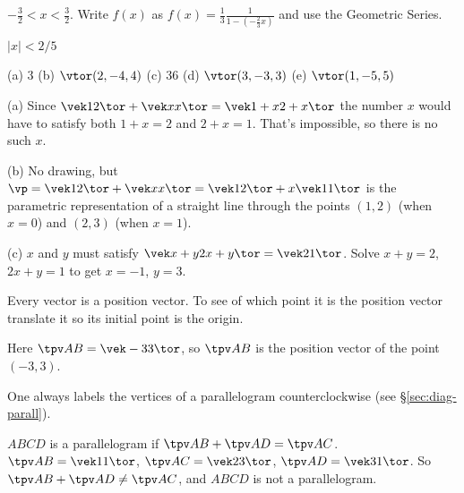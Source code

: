 \item[{\bfseries(V6.10)}]
$-\frac 32 < x < \frac 32$.  Write $f(x)$ as $f(x) = \frac 13 \frac
1{1-(-\frac23x)}$ and use the Geometric Series.
\bigskip

\item[{\bfseries(V6.11)}]
 $|x|<2/5$  %
\bigskip

\item[{\bfseries(VI9.3e)}]

(a) $3$ \quad
(b) $\vtor(2,-4,4)$  \quad
(c) 36  \quad
(d) $\vtor(3,-3,3)$  \quad
(e) $\vtor(1,-5,5)$
\bigskip

\item[{\bfseries(VI9.6c)}]

(a) Since $\vek 1 \\ 2 \tor +\vek x \\ x \tor = \vek 1+x \\ 2+x\tor$ the number
$x$ would have to satisfy both $1+x=2$ and $2+x=1$.  That's impossible, so
there is no such $x$.

(b) No drawing, but $\vp = \vek 1 \\ 2 \tor +\vek x \\ x \tor =
\vek 1\\ 2\tor + x \vek 1\\ 1\tor$ is the parametric representation of a
straight line through the points $(1,2)$ (when $x=0$) and $(2,3)$ (when
$x=1$).

(c) $x$ and $y $ must satisfy $\vek x+y \\ 2x+y\tor = \vek 2\\ 1\tor$.  Solve
$x+y = 2$, $2x+y = 1$ to get $x=-1$, $y=3$.
\bigskip

\item[{\bfseries(VI9.7)}]

Every vector is a position vector.  To see of which point it is the position
vector translate it so its initial point is the origin.

Here $\tpv AB = \vek -3\\ 3 \tor$, so $\tpv AB$ is the position vector of
the point $(-3,3)$.
\bigskip

\item[{\bfseries(VI9.8)}]

One always labels the vertices of a parallelogram counterclockwise (see
\S\ref{sec:diag-parall}).

$ABCD$ is a parallelogram if $\tpv AB + \tpv AD = \tpv AC$.
$\tpv AB = \vek 1\\ 1 \tor$, $\tpv AC = \vek 2\\ 3 \tor$, $\tpv AD = \vek 3\\
1 \tor$.  So $\tpv AB + \tpv AD \ne \tpv AC$, and $ABCD$ is not a
parallelogram.
\bigskip

